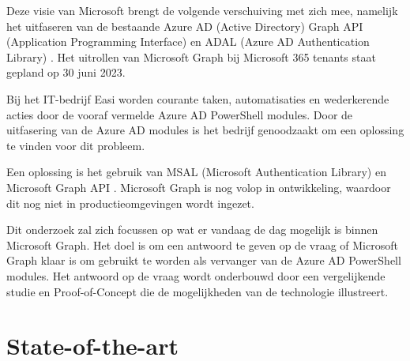 Deze visie van Microsoft brengt de volgende verschuiving met zich mee, namelijk het uitfaseren van de bestaande Azure AD (Active Directory) Graph API (Application Programming Interface) en ADAL (Azure AD Authentication Library) \autocite{Sahay2022}. Het uitrollen van Microsoft Graph bij Microsoft 365 tenants staat gepland op 30 juni 2023.

Bij het IT-bedrijf Easi worden courante taken, automatisaties en wederkerende acties door de vooraf vermelde Azure AD PowerShell modules. Door de uitfasering van de Azure AD modules is het bedrijf genoodzaakt om een oplossing te vinden voor dit probleem.

Een oplossing is het gebruik van MSAL (Microsoft Authentication Library) en Microsoft Graph API \autocite{Microsoft2023}. Microsoft Graph is nog volop in ontwikkeling, waardoor dit nog niet in productieomgevingen wordt ingezet.

Dit onderzoek zal zich focussen op wat er vandaag de dag mogelijk is binnen Microsoft Graph. Het doel is om een antwoord te geven op de vraag of Microsoft Graph klaar is om gebruikt te worden als vervanger van de Azure AD PowerShell modules. Het antwoord op de vraag wordt onderbouwd door een vergelijkende studie en Proof-of-Concept die de mogelijkheden van de technologie illustreert.



\section{State-of-the-art}%
\label{sec:state-of-the-art}

